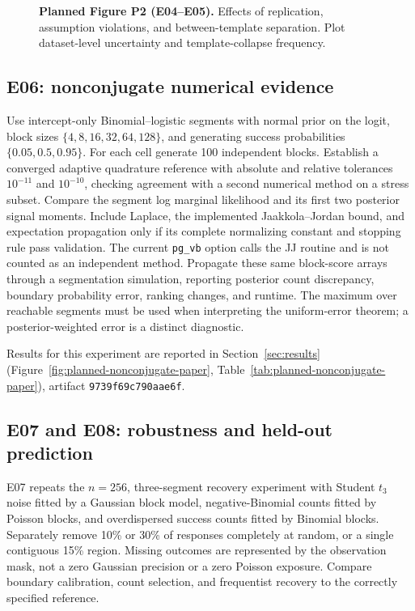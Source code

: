 \begin{figure}[!htbp]
\centering
{}
\hfill
{}
\caption{\textbf{Planned Figure P2 (E04--E05).} Effects of replication,
assumption violations, and between-template separation. Plot dataset-level
uncertainty and template-collapse frequency.}
\label{fig:planned-hierarchical-paper}
\end{figure}

\subsection{E06: nonconjugate numerical evidence}
Use intercept-only Binomial--logistic segments with normal prior on the logit,
block sizes $\{4,8,16,32,64,128\}$, and generating success probabilities
$\{0.05,0.5,0.95\}$. For each cell generate 100 independent blocks.
Establish a converged adaptive quadrature reference with absolute and relative
tolerances $10^{-11}$ and $10^{-10}$, checking agreement with a second numerical
method on a stress subset. Compare the segment log marginal likelihood and its
first two posterior signal moments. Include Laplace, the implemented
Jaakkola--Jordan bound, and expectation propagation only if its complete
normalizing constant and stopping rule pass validation. The current
\texttt{pg\_vb} option calls the JJ routine and is not counted as an
independent method. Propagate these same block-score arrays through a
segmentation simulation, reporting posterior count discrepancy, boundary
probability error, ranking changes, and runtime. The maximum over reachable
segments must be used when interpreting the uniform-error theorem; a
posterior-weighted error is a distinct diagnostic.

Results for this experiment are reported in Section~\ref{sec:results} (Figure~\ref{fig:planned-nonconjugate-paper}, Table~\ref{tab:planned-nonconjugate-paper}), artifact \texttt{9739f69c790aae6f}.

\subsection{E07 and E08: robustness and held-out prediction}
E07 repeats the $n=256$, three-segment recovery experiment with Student
$t_3$ noise fitted by a Gaussian block model, negative-Binomial counts fitted
by Poisson blocks, and overdispersed success counts fitted by Binomial blocks.
Separately remove 10\% or 30\% of responses completely at random, or a single
contiguous 15\% region. Missing outcomes are represented by the observation
mask, not a zero Gaussian precision or a zero Poisson exposure. Compare
boundary calibration, count selection, and frequentist recovery to the
correctly specified reference.

